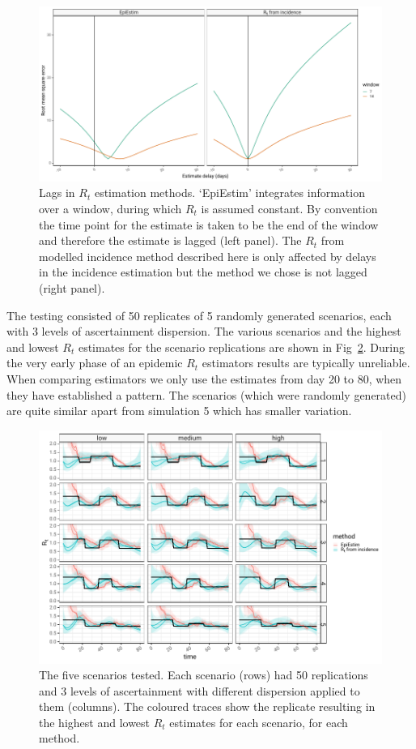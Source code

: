 \documentclass[a4paper, 12pt, twoside]{article}
\begin{document}
\begin{figure}[h!]
\centering
  \includegraphics{fig/fig2-lag-plot}
  \caption{Lags in $R_t$ estimation methods. `EpiEstim' integrates information over a window, during which $R_t$ is assumed constant. By convention the time point for the estimate is taken to be the end of the window and therefore the estimate is lagged (left panel). The $R_t$ from modelled incidence method described here is only affected by delays in the incidence estimation but the method we chose is not lagged (right panel).}
\label{fig:S2}
\end{figure}

\clearpage

The testing consisted of 50 replicates of 5 randomly generated scenarios, each with 3 levels of ascertainment dispersion. The various scenarios and the highest and lowest $R_t$ estimates for the scenario replications are shown in Fig~\ref{fig:S3}. During the very early phase of an epidemic $R_t$ estimators results are typically unreliable. When comparing estimators we only use the estimates from day 20 to 80, when they have established a pattern. The scenarios (which were randomly generated) are quite similar apart from simulation 5 which has smaller variation.

\begin{figure}[h!]
\centering
  \includegraphics{fig/fig3-scenario-estimates}
  \caption{The five scenarios tested. Each scenario (rows) had 50 replications and 3 levels of ascertainment with different dispersion applied to them (columns). The coloured traces show the replicate resulting in the highest and lowest $R_t$ estimates for each scenario, for each method. }
\label{fig:S3}
\end{figure}
\end{document}
